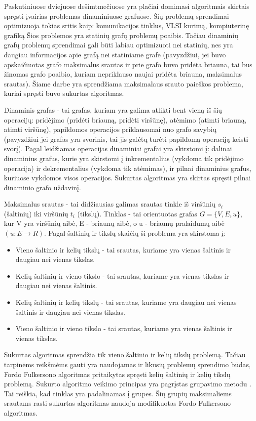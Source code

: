 Paskutiniuose dviejuose dešimtmečiuose yra plačiai domimasi algoritmais skirtais spręsti įvairias problemas dinaminiuose grafuose. Šių problemų sprendimai optimizuoja tokias sritis kaip: komunikacijos tinklus, VLSI kūrimą, kompiuterinę grafiką \cite{DynamicGraphs, DGA} Šios problemos yra statinių grafų problemų poaibis. Tačiau dinaminių grafų problemų sprendimai gali būti labiau optimizuoti nei statinių, nes yra daugiau informacijos apie grafą nei statiniame grafe (pavyzdžiui, jei buvo apskaičiuotas grafo maksimalus srautas ir prie grafo buvo pridėta briauna, tai bus žinomas grafo poaibio, kuriam nepriklauso naujai pridėta briauna, maksimalus srautas). Šiame darbe yra sprendžiama maksimalaus srauto paieškos problema, kuriai spręsti buvo sukurtas algoritmas.

Dinaminis grafas - tai grafas, kuriam yra galima atlikti bent vieną iš šių operacijų: pridėjimo (pridėti briauną, pridėti viršūnę), atėmimo (atimti briauną, atimti viršūnę), papildomos operacijos priklausomai nuo grafo savybių (pavyzdžiui jei grafas yra svorinis, tai jis galėtų turėti papildomą operaciją keisti svorį). Pagal leidžiamas operacijas dinaminiai grafai yra skirstomi į: dalinai dinaminius grafus, kurie yra skirstomi į inkrementalius (vykdoma tik pridėjimo operacija) ir dekrementalius (vykdoma tik atėmimas), ir pilnai dinaminius grafus, kuriuose vykdomos visos operacijos. Sukurtas algoritmas yra skirtas spręsti pilnai dinaminio grafo uždavinį.

Maksimalus srautas - tai didžiausias galimas srautas tinkle iš viršūnių $s_i$ (šaltinių) iki viršūnių $t_i$ (tikslų). Tinklas - tai orientuotas grafas $G= \{V, E, u\}$, kur V yra viršūnių aibė, E - briaunų aibė, o u - briaunų pralaidumų aibė $( u : E \rightarrow R )$. Pagal šaltinių ir tikslų skaičių ši problema yra skirstoma į:
\begin{itemize}
	\item Vieno šaltinio ir kelių tikslų - tai srautas, kuriame yra vienas šaltinis ir daugiau nei vienas tikslas.
	\item Kelių šaltinių ir vieno tikslo - tai srautas, kuriame yra vienas tikslas ir daugiau nei vienas šaltinis.
	\item Kelių šaltinių ir kelių tikslų  - tai srautas, kuriame yra daugiau nei vienas šaltinis ir daugiau nei vienas tikslas.
	\item Vieno šaltinio ir vieno tikslo - tai srautas, kuriame yra vienas šaltinis ir vienas tikslas.
\end{itemize}
Sukurtas algoritmas sprendžia tik vieno šaltinio ir kelių tikslų problemą. Tačiau tarpinėms reikšmėms gauti yra naudojamas ir likusių problemų sprendimo būdas, Fordo Fulkersono algoritmas  \cite{FiN} pritaikytas spręsti kelių šaltinių ir kelių tikslų problemą. Sukurto algoritmo veikimo principas yra pagrįstas grupavimo metodu \cite{DSfUoMST}. Tai reiškia, kad tinklas yra padalinamas į grupes. Šių grupių maksimaliems srautams rasti sukurtas algoritmas naudoja modifikuotas Fordo Fulkersono algoritmas.

